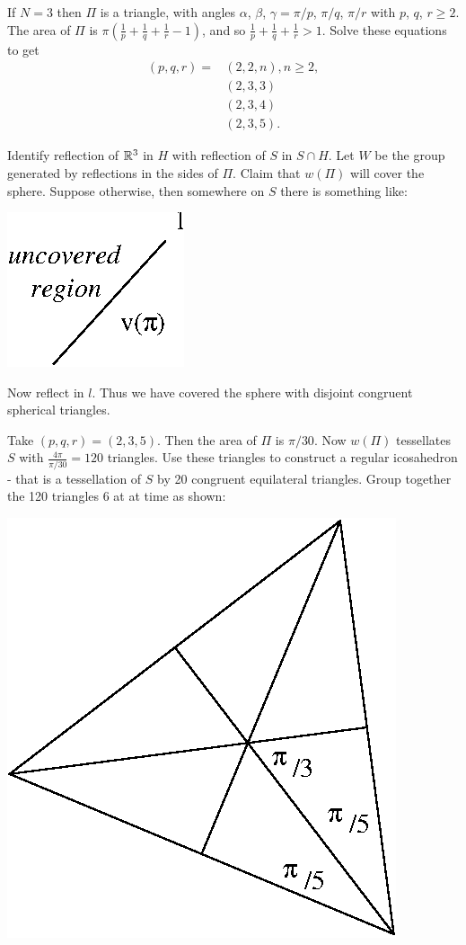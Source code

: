 \documentclass{notes}
\theoremstyle{plain}
\begin{document}
If $N=3$ then $\Pi$ is a triangle, with angles $\alpha$, $\beta$, $\gamma =
\pi/p$, $\pi/q$, $\pi/r$ with $p$, $q$, $r \ge 2$.  The area of $\Pi$ is
$\pi \left( \frac{1}{p} + \frac{1}{q} + \frac{1}{r} - 1 \right)$, and so
$\frac{1}{p} + \frac{1}{q} + \frac{1}{r} > 1$.  Solve these equations to
get \begin{align*}
(p,q,r) = &(2,2,n), n \ge 2, \\
&(2,3,3) \\ &(2,3,4) \\ &(2,3,5).
\end{align*}

Identify reflection of $\mathbb{R}^3$ in $H$ with reflection of $S$ in $S \cap H$.
Let $W$ be the group generated by reflections in the sides of $\Pi$.  Claim
that $w(\Pi)$ will cover the sphere.  Suppose otherwise,  then somewhere on $S$
there is something like:
\begin{center}
\includegraphics{sphcov.eps}
\end{center}
Now reflect in $l$.  Thus we have covered the sphere with disjoint congruent
spherical triangles.

Take $(p,q,r) = (2,3,5)$.  Then the area of $\Pi$ is $\pi/30$.  Now $w(\Pi)$
tessellates $S$ with $\frac{4 \pi}{\pi/30} = 120$ triangles.  Use these
triangles to construct a regular icosahedron - that is a tessellation of $S$
by 20 congruent equilateral triangles.  Group together the 120 triangles 6 at
at time as shown:

\begin{center}
\includegraphics{icosa.eps}
\end{center}
\end{document}
